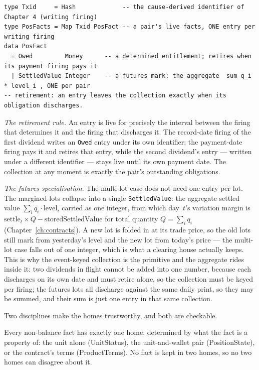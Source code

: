 \begin{lstlisting}
type Txid     = Hash             -- the cause-derived identifier of Chapter 4 (writing firing)
type PosFacts = Map Txid PosFact -- a pair's live facts, ONE entry per writing firing
data PosFact
  = Owed         Money      -- a determined entitlement; retires when its payment firing pays it
  | SettledValue Integer    -- a futures mark: the aggregate  sum q_i * level_i , ONE per pair
-- retirement: an entry leaves the collection exactly when its obligation discharges.
\end{lstlisting}

\emph{The retirement rule.} An entry is live for precisely the interval between the firing
that determines it and the firing that discharges it. The record-date firing of the first
dividend writes an \texttt{Owed} entry under its own identifier; the payment-date firing pays
it and retires that entry, while the second dividend's entry --- written under a different
identifier --- stays live until its own payment date. The collection at any moment is exactly
the pair's outstanding obligations.

\emph{The futures specialisation.} The multi-lot case does not need one entry per lot. The
margined lots collapse into a single \texttt{SettledValue}: the aggregate settled value
$\sum_i q_i \cdot \text{level}_i$ carried as one integer, from which day~$t$'s variation
margin is $\text{settle}_t \times Q - \text{storedSettledValue}$ for total quantity
$Q=\sum_i q_i$ (Chapter~\ref{ch:contracts}). A new lot is folded in at its trade price, so the
old lots still mark from yesterday's level and the new lot from today's price --- the
multi-lot case falls out of one integer, which is what a clearing house actually keeps. This
is why the event-keyed collection is the primitive and the aggregate rides inside it: two
dividends in flight cannot be added into one number, because each discharges on its own date
and must retire alone, so the collection must be keyed per firing; the futures lots all
discharge against the same daily print, so they may be summed, and their sum is just one entry
in that same collection.

Two disciplines make the homes trustworthy, and both are checkable.

\begin{principle}\label{prin:one-home}
Every non-balance fact has exactly one home, determined by what the fact is a property of:
the unit alone (UnitStatus), the unit-and-wallet pair (PositionState), or the contract's
terms (ProductTerms). No fact is kept in two homes, so no two homes can disagree about it.
\end{principle}

